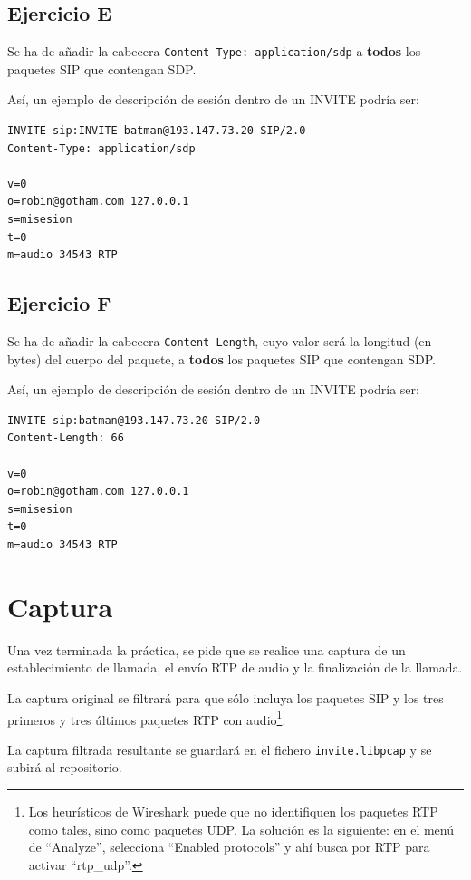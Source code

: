 \documentclass[a4paper,11pt]{article}
\begin{document}
\subsection*{Ejercicio E}

Se ha de añadir la cabecera \texttt{Content-Type: application/sdp} a {\bf todos} los paquetes SIP que contengan SDP.

Así, un ejemplo de descripción de sesión dentro de un INVITE podría ser:

\begin{verbatim}
INVITE sip:INVITE batman@193.147.73.20 SIP/2.0
Content-Type: application/sdp

v=0
o=robin@gotham.com 127.0.0.1
s=misesion
t=0
m=audio 34543 RTP
\end{verbatim}


\subsection*{Ejercicio F}

Se ha de añadir la cabecera \texttt{Content-Length}, cuyo valor será la longitud (en bytes) del cuerpo del paquete, a {\bf todos} los paquetes SIP que contengan SDP.

Así, un ejemplo de descripción de sesión dentro de un INVITE podría ser:

\begin{verbatim}
INVITE sip:batman@193.147.73.20 SIP/2.0
Content-Length: 66

v=0
o=robin@gotham.com 127.0.0.1
s=misesion
t=0
m=audio 34543 RTP
\end{verbatim}




\section*{Captura}

Una vez terminada la práctica, se pide que se realice una captura de un
establecimiento de llamada, el envío RTP de audio y la finalización de
la llamada. 

La captura original se filtrará para que sólo incluya los paquetes
SIP y los tres primeros y tres últimos paquetes RTP con audio\footnote{Los heurísticos de Wireshark puede que no identifiquen los paquetes RTP como tales, sino como paquetes UDP. La solución es la siguiente: en el menú de ``Analyze'', selecciona ``Enabled protocols'' y ahí busca por RTP para activar ``rtp\_udp''.}.

La captura filtrada resultante se guardará en el fichero \texttt{invite.libpcap}
y se subirá al repositorio.
\end{document}
